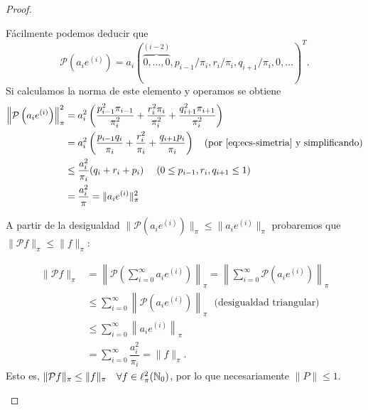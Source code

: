 \begin{proof}
\begin{itemize}
            Fácilmente podemos deducir que $$\mathcal{P}\left(a_i e^{(i)}\right) = a_i(\overbrace{0,\dots,0}^{(i-2)}, p_{i-1}/\pi_i, r_i/\pi_i, q_{i+1}/\pi_i,0,\dots)^T.$$ Si calculamos la norma de este elemento y operamos se obtiene
            \begin{equation*}
                \begin{split}
                    \left\|\mathcal{P}\left(a_i e^{(i)}\right)\right\|_\pi^2 &= a_i^2\left(\dfrac{p_{i-1}^2\pi_{i-1}}{\pi_i^2}+\dfrac{r_{i}^2\pi_{i}}{\pi_i^2}+\dfrac{q_{i+1}^2\pi_{i+1}}{\pi_i^2}\right) \\
                    &= a_i^2\left(\dfrac{p_{i-1}q_i}{\pi_i}+\dfrac{r_{i}^2}{\pi_i}+\dfrac{q_{i+1}p_i}{\pi_i}\right)  \ \ \ \text{(por \eqref{eq:ecs-simetria} y simplificando)} \\
                    &\leq  \dfrac{a_i^2}{\pi_i}(q_i+r_i+p_i) \ \ \ \ (0\leq p_{i-1},r_i, q_{i+1}\leq 1) \\
                    &= \dfrac{a_i^2}{\pi} = \|a_i e^{(i)}\|_\pi^2
                \end{split}
            \end{equation*}

            A partir de la desigualdad $\|\mathcal{P}\left(a_i e^{(i)}\right)\|_\pi\leq \|a_i e^{(i)}\|_\pi$ probaremos que $\|\mathcal{P} f \|_\pi \leq \|f\|_\pi$:

            \begin{equation*}
                \begin{split}
                    \|\mathcal{P} f \|_\pi &=\left\| \mathcal{P}\left(\sum_{i=0}^\infty a_i e^{(i)}\right) \right\|_\pi = \left\| \sum_{i=0}^\infty \mathcal{P} \left(a_i e^{(i)}\right) \right\|_\pi \\
                    &\leq \sum_{i=0}^\infty \left\|  \mathcal{P} \left(a_i e^{(i)}\right) \right\|_\pi \ \ \ \text{(desigualdad triangular)} \\
                    &\leq \sum_{i=0}^\infty \left\|a_i e^{(i)}\right\|_\pi \\
                    &= \sum_{i=0}^\infty \dfrac{a_i^2}{\pi_i} = \| f \|_\pi.
                 \end{split}
            \end{equation*}
            Esto es, $ \|\mathcal{P} f \|_\pi \leq \|f\|_\pi \ \ \ \forall f\in\ell^2_\pi(\N_0)$, por lo que necesariamente $\|P\|\leq 1$.


\end{itemize}
\end{proof}
